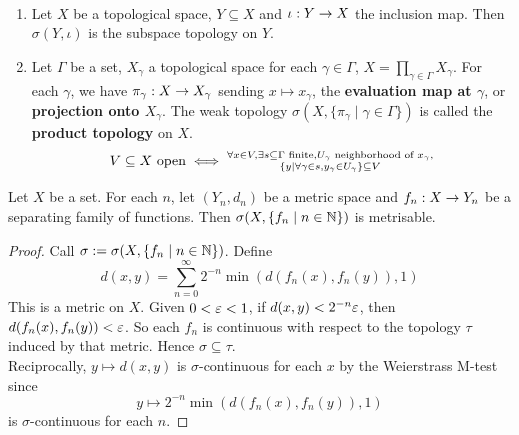 \documentclass{article}
\begin{document}
\begin{egs}~
  \begin{enumerate}
    \item Let $X$ be a topological space, $Y \subseteq X$ and $\iota : Y \rightarrow X$ the inclusion map. Then $\sigma(Y, {\iota})$ is the subspace topology on $Y$.
    \item Let $\Gamma$ be a set, $X_\gamma$ a topological space for each $\gamma \in \Gamma$, $X = \prod_{\gamma \in \Gamma} X_\gamma$. For each $\gamma$, we have $\pi_\gamma : X \rightarrow X_\gamma$ sending $x \mapsto x_\gamma$, the {\bf evaluation map at $\gamma$}, or {\bf projection onto $X_\gamma$}. The weak topology $\sigma(X, \{\pi_\gamma \mid \gamma \in \Gamma\})$ is called the {\bf product topology} on $X$.
    $$V \subseteq X \text{ open} \iff \substack{\forall x \in V, \exists s \subseteq \Gamma \text{ finite}, U_\gamma \text{ neighborhood of } x_\gamma, \\ \{y \mid \forall \gamma \in s, y_\gamma \in U_\gamma\} \subseteq V}$$
  \end{enumerate}
\end{egs}

\begin{nprop}
  Let $X$ be a set. For each $n$, let $(Y_n, d_n)$ be a metric space and $f_n : X \rightarrow Y_n$ be a separating family of functions. Then $\sigma(X, \{f_n \mid n \in \mathbb N\})$ is metrisable.
\end{nprop}
\begin{proof}
  Call $\sigma := \sigma(X, \{f_n \mid n \in \mathbb N\})$. Define
  $$d(x, y) = \sum_{n = 0}^\infty 2^{-n}\min(d(f_n(x), f_n(y)), 1)$$
  This is a metric on $X$. Given $0 < \varepsilon < 1$, if $d(x, y) < 2^{-n}\varepsilon$, then $d(f_n(x), f_n(y)) < \varepsilon$. So each $f_n$ is continuous with respect to the topology $\tau$ induced by that metric. Hence $\sigma \subseteq \tau$. \\
  Reciprocally, $y \mapsto d(x, y)$ is $\sigma$-continuous for each $x$ by the Weierstrass M-test since
  $$y \mapsto 2^{-n}\min(d(f_n(x), f_n(y)), 1)$$
  is $\sigma$-continuous for each $n$.
\end{proof}
\end{document}
